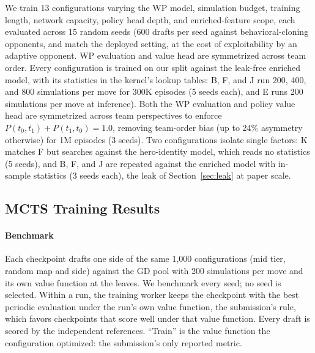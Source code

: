 \documentclass[journal]{IEEEtran}
\providecommand{\DIFaddtex}[1]{{\protect\color{blue} \sf #1}} %
\providecommand{\DIFdeltex}[1]{{\protect\color{red} \scriptsize #1}} %
\providecommand{\DIFaddbegin}{} %
\providecommand{\DIFaddend}{} %
\providecommand{\DIFdelbegin}{} %
\providecommand{\DIFdelend}{} %
\providecommand{\DIFadd}[1]{\texorpdfstring{\DIFaddtex{#1}}{#1}} %
\providecommand{\DIFdel}[1]{\texorpdfstring{\DIFdeltex{#1}}{}} %
\begin{document}
\DIFdel{We train 13 configurations varying the WP model, simulation budget, training length, network capacity, policy head depth, and enriched-feature scope, each evaluated across 15 random seeds (600 drafts per seed against behavioral-cloning opponents, }\DIFdelend \DIFaddbegin \DIFadd{and match the deployed setting, at the cost of exploitability by an adaptive opponent. WP evaluation and value head are symmetrized across team order. Every configuration is trained on our split against the leak-free enriched model, with its statistics in the kernel's lookup tables: B, F, and J run 200, 400, and 800 simulations per move for 300K episodes (5 seeds each), and E runs }\DIFaddend 200 simulations \DIFdelbegin \DIFdel{per move at inference). Both the WP evaluation and policy value head are symmetrized across team perspectives to enforce $P(t_0, t_1) + P(t_1, t_0) = 1.0$, removing team-order bias (up to 24\% asymmetry otherwise)}\DIFdelend \DIFaddbegin \DIFadd{for 1M episodes (3 seeds). Two configurations isolate single factors: K matches F but searches against the hero-identity model, which reads no statistics (5 seeds), and B, F, and J are repeated against the enriched model with in-sample statistics (3 seeds each), the leak of Section~\ref{sec:leak} at paper scale}\DIFaddend .

\DIFdelbegin \subsection{\DIFdel{MCTS Training Results}}
\addtocounter{subsection}{-1}%
\DIFdelend \DIFaddbegin \paragraph{\DIFadd{Benchmark}} \DIFadd{Each checkpoint drafts one side of the same 1,000 configurations (mid tier, random map and side) against the GD pool with 200 simulations per move and its own value function at the leaves. We benchmark every seed; no seed is selected. Within a run, the training worker keeps the checkpoint with the best periodic evaluation under the run's own value function, the submission's rule, which favors checkpoints that score well under that value function. Every draft is scored by the independent references. ``Train'' is the value function the configuration optimized: the submission's only reported metric.
}\DIFaddend 
\end{document}
